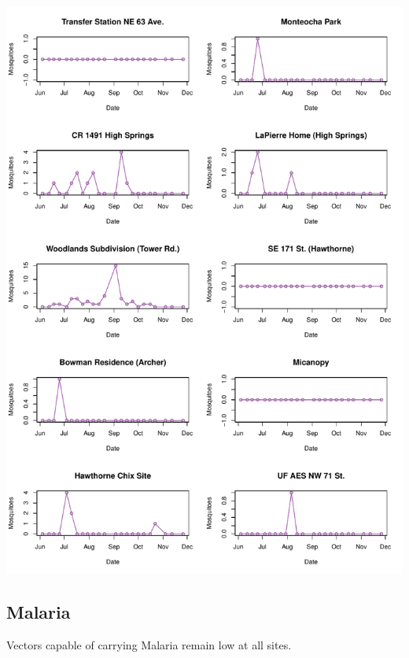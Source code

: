 \documentclass{article}
\begin{document}
\begin{center}
\includegraphics{mosq08nov13-011}
\newpage
\subsection*{Malaria}

\end{center}

Vectors capable of carrying Malaria remain low at all sites.\\
\end{document}
